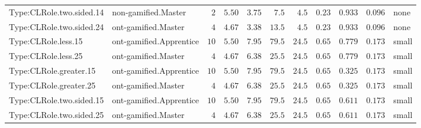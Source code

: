 \documentclass[6pt,a4paper]{article}
\begin{document}
{\begin{longtable}{llrrrrrrrrl}
Type:CLRole.two.sided.14&non-gamified.Master&$ 2$&$5.50$&$ 3.75$&$  7.5$&$ 4.5$&$0.23$&$0.933$&$0.096$&none\tabularnewline
Type:CLRole.two.sided.24&ont-gamified.Master&$ 4$&$4.67$&$ 3.38$&$ 13.5$&$ 4.5$&$0.23$&$0.933$&$0.096$&none\tabularnewline
Type:CLRole.less.15&ont-gamified.Apprentice&$10$&$5.50$&$ 7.95$&$ 79.5$&$24.5$&$0.65$&$0.779$&$0.173$&small\tabularnewline
Type:CLRole.less.25&ont-gamified.Master&$ 4$&$4.67$&$ 6.38$&$ 25.5$&$24.5$&$0.65$&$0.779$&$0.173$&small\tabularnewline
Type:CLRole.greater.15&ont-gamified.Apprentice&$10$&$5.50$&$ 7.95$&$ 79.5$&$24.5$&$0.65$&$0.325$&$0.173$&small\tabularnewline
Type:CLRole.greater.25&ont-gamified.Master&$ 4$&$4.67$&$ 6.38$&$ 25.5$&$24.5$&$0.65$&$0.325$&$0.173$&small\tabularnewline
\newpage
Type:CLRole.two.sided.15&ont-gamified.Apprentice&$10$&$5.50$&$ 7.95$&$ 79.5$&$24.5$&$0.65$&$0.611$&$0.173$&small\tabularnewline
Type:CLRole.two.sided.25&ont-gamified.Master&$ 4$&$4.67$&$ 6.38$&$ 25.5$&$24.5$&$0.65$&$0.611$&$0.173$&small\tabularnewline
\hline
\end{longtable}}
\end{document}
